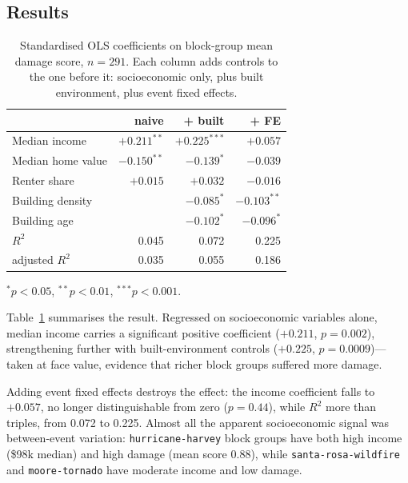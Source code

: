 \documentclass[10pt,twocolumn]{article}
\begin{document}
\subsection{Results}

\begin{table}[t]
\centering
\footnotesize
\caption{Standardised OLS coefficients on block-group mean damage score, $n = 291$. Each column adds
controls to the one before it: socioeconomic only, plus built environment, plus event fixed effects.}
\label{tab:socio}
\begin{tabular}{@{}lrrr@{}}
\toprule
& \textbf{naive} & \textbf{+ built} & \textbf{+ FE} \\
\midrule
Median income      & $+0.211^{**}$ & $+0.225^{***}$ & $+0.057$ \\
Median home value  & $-0.150^{**}$ & $-0.139^{*}$   & $-0.039$ \\
Renter share       & $+0.015$      & $+0.032$       & $-0.016$ \\
Building density   &               & $-0.085^{*}$   & $-0.103^{**}$ \\
Building age       &               & $-0.102^{*}$   & $-0.096^{*}$ \\
\midrule
$R^2$              & 0.045 & 0.072 & 0.225 \\
adjusted $R^2$     & 0.035 & 0.055 & 0.186 \\
\bottomrule
\end{tabular}
\vspace{2pt}
{\scriptsize $^{*}p<0.05$, $^{**}p<0.01$, $^{***}p<0.001$.}
\end{table}

Table~\ref{tab:socio} summarises the result. Regressed on socioeconomic variables alone, median
income carries a significant positive coefficient ($+0.211$, $p = 0.002$), strengthening further with
built-environment controls ($+0.225$, $p = 0.0009$)---taken at face value, evidence that richer
block groups suffered more damage.

Adding event fixed effects destroys the effect: the income coefficient falls to $+0.057$, no longer
distinguishable from zero ($p = 0.44$), while $R^2$ more than triples, from 0.072 to 0.225. Almost all
the apparent socioeconomic signal was between-event variation: \texttt{hurricane-\allowbreak harvey}
block groups have both high income (\$98k median) and high damage (mean score 0.88), while
\texttt{santa-\allowbreak rosa-wildfire} and \texttt{moore-tornado} have moderate income and low damage.
\end{document}
